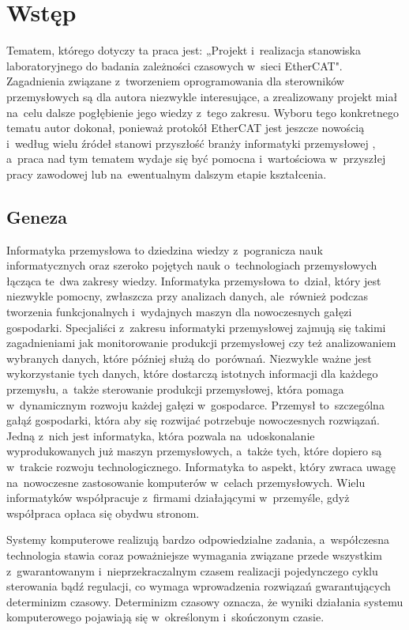 \section{Wstęp}
Tematem, którego dotyczy ta praca jest: „Projekt i~realizacja stanowiska laboratoryjnego do badania zależności czasowych w~sieci EtherCAT". Zagadnienia związane z~tworzeniem oprogramowania dla sterowników przemysłowych są dla autora niezwykle interesujące, a zrealizowany projekt miał na~celu dalsze pogłębienie jego wiedzy z~tego zakresu. Wyboru tego konkretnego tematu autor dokonał, ponieważ protokół EtherCAT jest jeszcze nowością i~według wielu źródeł stanowi przyszłość branży informatyki przemysłowej \cite{art1_etherCAT, art2_etherCAT}, a~praca nad tym tematem wydaje się być pomocna i~wartościowa w~przyszłej pracy zawodowej lub na~ewentualnym dalszym etapie kształcenia.

\subsection{Geneza}
Informatyka przemysłowa to dziedzina wiedzy z~pogranicza nauk informatycznych oraz szeroko pojętych nauk o~technologiach przemysłowych łącząca te~dwa zakresy wiedzy. Informatyka przemysłowa to~dział, który jest niezwykle pomocny, zwłaszcza przy analizach danych, ale~również podczas tworzenia funkcjonalnych i~wydajnych maszyn dla nowoczesnych gałęzi gospodarki. Specjaliści z~zakresu informatyki przemysłowej zajmują się takimi zagadnieniami jak monitorowanie produkcji przemysłowej czy też analizowaniem wybranych danych, które później służą do~porównań. Niezwykle ważne jest wykorzystanie tych danych, które dostarczą istotnych informacji dla każdego przemysłu, a~także sterowanie produkcji przemysłowej, która pomaga w~dynamicznym rozwoju każdej gałęzi w~gospodarce. 
Przemysł to~szczególna gałąź gospodarki, która aby się rozwijać potrzebuje nowoczesnych rozwiązań. Jedną z~nich jest informatyka, która pozwala na~udoskonalanie wyprodukowanych już maszyn przemysłowych, a~także tych, które dopiero są w~trakcie rozwoju technologicznego. Informatyka to aspekt, który zwraca uwagę na~nowoczesne zastosowanie komputerów w~celach przemysłowych. Wielu informatyków współpracuje z~firmami działającymi w~przemyśle, gdyż współpraca opłaca się obydwu stronom.

Systemy komputerowe realizują bardzo odpowiedzialne zadania, a~współczesna technologia stawia coraz poważniejsze wymagania związane przede wszystkim z~gwarantowanym i~nieprzekraczalnym czasem realizacji pojedynczego cyklu sterowania bądź regulacji, co wymaga wprowadzenia rozwiązań gwarantujących determinizm czasowy. Determinizm czasowy oznacza, że wyniki działania systemu komputerowego pojawiają się w~określonym i~skończonym czasie.

